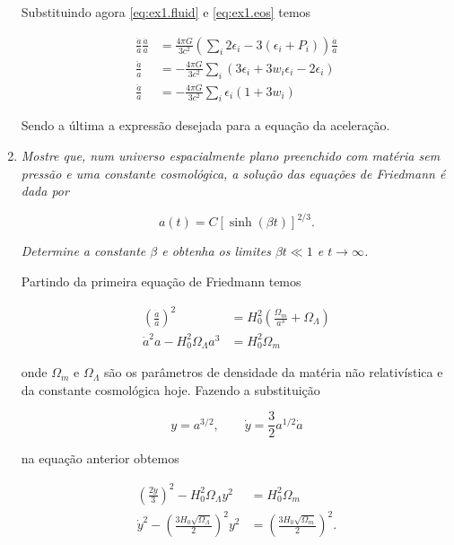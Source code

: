 \documentclass[a4paper, 12pt, notitlepage]{article}
\begin{document}
\begin{enumerate}
Substituindo agora \eqref{eq:ex1.fluid} e \eqref{eq:ex1.eos} temos

\begin{align*}
  \frac{\ddot{a}}{a}\frac{\dot{a}}{a} &= \frac{4\pi G}{3c^2}\left(\sum_i 2\epsilon_i - 3(\epsilon_i + P_i)\right) \frac{\dot{a}}{a} \\
  \frac{\ddot{a}}{a} &= -\frac{4\pi G}{3c^2} \sum_i \left(3\epsilon_i + 3w_i \epsilon_i - 2\epsilon_i\right) \\
  \frac{\ddot{a}}{a} &= -\frac{4\pi G}{3c^2} \sum_i \epsilon_i(1 + 3w_i)
\end{align*}

Sendo a última a expressão desejada para a equação da aceleração.

\pagebreak

\item \textit{Mostre que, num universo espacialmente plano preenchido com matéria sem pressão e uma constante cosmológica, a solução das equações de Friedmann é dada por}

\begin{equation}
	a(t) = C[\sinh(\beta t)]^{2/3}.
\end{equation}

\textit{Determine a constante $\beta$ e obtenha os limites $\beta t \ll 1$ e $t \to \infty$.}
\vspace{1cm}

Partindo da primeira equação de Friedmann temos

\begin{align*}
  \left(\frac{\dot{a}}{a}\right)^2 &= H_0^2 \left(\frac{\Omega_m}{a^3} + \Omega_\Lambda\right) \\
  \dot{a}^2 a - H_0^2 \Omega_\Lambda a^3 &= H_0^2 \Omega_m
\end{align*}

\noindent onde $\Omega_m$ e $\Omega_\Lambda$ são os parâmetros de densidade da matéria não relativística e da constante cosmológica hoje. Fazendo a substituição

$$ y = a^{3/2}, \qquad \dot{y} = \frac{3}{2}a^{1/2} \dot{a} $$

\noindent na equação anterior obtemos

\begin{align*}
  \left(\frac{2\dot{y}}{3}\right)^2 - H_0^2 \Omega_\Lambda y^2 &= H_0^2 \Omega_m \\
  \dot{y}^2 - \left(\frac{3 H_0 \sqrt{\Omega_\Lambda}}{2}\right)^2 y^2 &= \left(\frac{3 H_0 \sqrt{\Omega_m}}{2}\right)^2.
\end{align*}


\end{enumerate}
\end{document}
